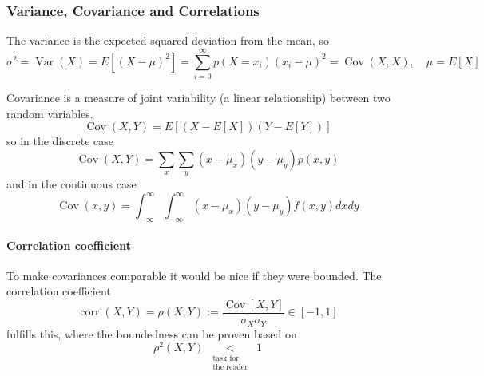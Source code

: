 \subsubsection{Variance, Covariance and Correlations}
The variance is the expected squared deviation from the mean, so
\begin{equation}
    \sigma^2=\operatorname{Var}(X)=E\left[(X-\mu)^2\right]=\sum_{i=0}^{\infty} p\left(X=x_i\right)\left(x_i-\mu\right)^2=\operatorname{Cov}(X, X), \quad \mu=E[X]
\end{equation}

Covariance is a measure of joint variability (a linear relationship) between two random variables.
\begin{equation}
    \operatorname{Cov}(X, Y)=E[(X-E[X])(Y-E[Y])]
\end{equation}
so in the discrete case
\begin{equation}
    \operatorname{Cov}(X, Y)=\sum_x \sum_y\left(x-\mu_x\right)\left(y-\mu_y\right) p(x, y)
\end{equation}
and in the continuous case
\begin{equation}
    \operatorname{Cov}(x, y)=\int_{-\infty}^{\infty} \int_{-\infty}^{\infty}\left(x-\mu_x\right)\left(y-\mu_y\right) f(x, y) d x d y
\end{equation}

\paragraph*{Correlation coefficient} To make covariances comparable it would be nice if they were bounded.
The correlation coefficient
\begin{equation}
    \operatorname{corr}(X, Y)=\rho(X, Y):=\frac{\operatorname{Cov}[X, Y]}{\sigma_X \sigma_Y} \in[-1,1]
\end{equation}
fulfills this, where the boundedness can be proven based on
\begin{equation}
    \rho^2(X, Y) \underset{\substack{\text { task for } \\ \text { the reader }}}{<} 1
\end{equation}

